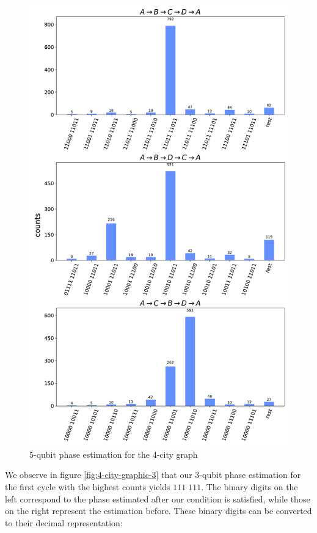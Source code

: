 \documentclass[msc,oneside]{ubcthesis}
\begin{document}
		\begin{figure}[!h]
		\centering
		\includegraphics[width=\textwidth,height=0.9\textheight,keepaspectratio]{"graphics/5qubit-4city"}
		\caption{5-qubit phase estimation for the 4-city graph}
		\label{fig:4-city-graphic-5}
	\end{figure}		
	
 We observe in figure \ref{fig:4-city-graphic-3} that our 3-qubit phase estimation for the first cycle with the highest counts yields $111\; 111$. The binary digits on the left correspond to the phase estimated after our condition is satisfied, while those on the right represent the estimation before. These binary digits can be converted to their decimal representation: 
 
\end{document}
